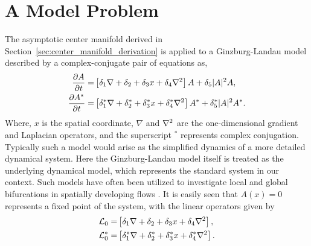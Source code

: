 \section{A Model Problem}
\label{sec:ginzburg_landau}

The asymptotic center manifold derived in Section~\ref{sec:center_manifold_derivation} is applied to a Ginzburg-Landau model described by a complex-conjugate pair of equations as,
\begin{subequations}
	\label{eqn:ginzburg_landau}
	\begin{align}
		\dfrac{\partial A}{\partial t} =& \left[\delta_{1}\nabla + \delta_{2} + \delta_{3}x + \delta_{4}\nabla^{2}\right]A + \delta_{5}|A|^{2}A, \\
		\dfrac{\partial A^{*}}{\partial t} =& \left[\delta^{*}_{1}\nabla + \delta^{*}_{2} + \delta^{*}_{3}x + \delta^{*}_{4}\nabla^{2}\right]A^{*} + \delta^{*}_{5}|A|^{2}A^{*}. 
	\end{align}
\end{subequations}
Where, $x$ is the spatial coordinate, $\nabla$ and $\nabla^{2}$ are the one-dimensional gradient and Laplacian operators, and the superscript $^{*}$ represents complex conjugation. Typically such a model would arise as the simplified dynamics of a more detailed dynamical system. Here the Ginzburg-Landau model itself is treated as the underlying dynamical model, which represents the standard system in our context. Such models have often been utilized to investigate local and global bifurcations in spatially developing flows \citep{chomaz88,chomaz05}. It is easily seen that $A(x)=0$ represents a fixed point of the system, with the linear operators given by
\begin{align}
	\mathcal{L}_{0}	=& \left[\delta_{1}\nabla + \delta_{2} + \delta_{3}x + \delta_{4}\nabla^{2}\right], \nonumber \\
	\mathcal{L}^{*}_{0} =&\left[\delta^{*}_{1}\nabla + \delta^{*}_{2} + \delta^{*}_{3}x + \delta^{*}_{4}\nabla^{2}\right]. \nonumber
\end{align}

